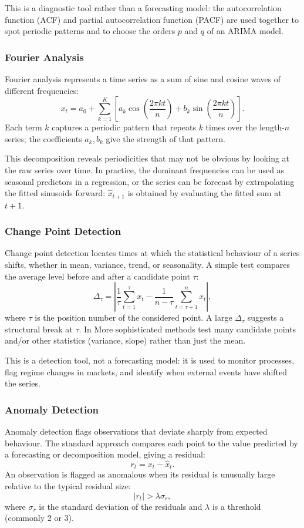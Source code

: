 \documentclass[12pt,a4paper]{article}
\begin{document}
This is a diagnostic tool rather than a forecasting model: the autocorrelation function (ACF) and partial autocorrelation function (PACF) are used together to spot periodic patterns and to choose the orders $p$ and $q$ of an ARIMA model.

\subsubsection*{Fourier Analysis}
Fourier analysis represents a time series as a sum of sine and cosine waves of different frequencies:
$$
x_t = a_0 + \sum_{k=1}^{K}
\left[
a_k \cos\left(\dfrac{2\pi kt}{n}\right) +
b_k \sin\left(\dfrac{2\pi kt}{n}\right)
\right].
$$
Each term $k$ captures a periodic pattern that repeats $k$ times over the length-$n$ series; the coefficients $a_k,b_k$ give the strength of that pattern.

This decomposition reveals periodicities that may not be obvious by looking at the raw series over time. In practice, the dominant frequencies can be used as seasonal predictors in a regression, or the series can be forecast by extrapolating the fitted sinusoids forward: $\hat{x}_{t+1}$ is obtained by evaluating the fitted sum at $t+1$.

\subsubsection*{Change Point Detection}
Change point detection locates times at which the statistical behaviour of a series shifts, whether in mean, variance, trend, or seasonality. A simple test compares the average level before and after a candidate point $\tau$:
$$
\Delta_{\tau} =
\left|
\dfrac{1}{\tau}\sum_{t=1}^{\tau}x_t -
\dfrac{1}{n-\tau}\sum_{t=\tau+1}^{n}x_t
\right|,
$$
where $\tau$ is the position number of the considered point.
A large $\Delta_\tau$ suggests a structural break at $\tau$. In 
More sophisticated methods test many candidate points and/or other statistics (variance, slope) rather than just the mean.

This is a detection tool, not a forecasting model: it is used to monitor processes, flag regime changes in markets, and identify when external events have shifted the series.

\subsubsection*{Anomaly Detection}
Anomaly detection flags observations that deviate sharply from expected behaviour. The standard approach compares each point to the value predicted by a forecasting or decomposition model, giving a residual:
$$
r_t = x_t - \hat{x}_t.
$$
An observation is flagged as anomalous when its residual is unusually large relative to the typical residual size:
$$
|r_t| > \lambda \sigma_r,
$$
where $\sigma_r$ is the standard deviation of the residuals and $\lambda$ is a threshold (commonly $2$ or $3$).
\end{document}
